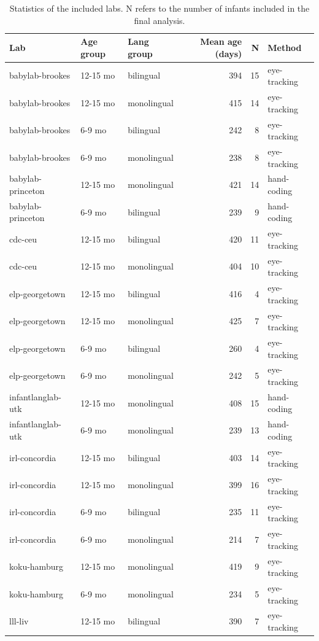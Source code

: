 \documentclass[,man,floatsintext]{apa6}
\begin{document}
\begin{longtable}[t]{lllrrl}
\caption{\label{tab:unnamed-chunk-4}Statistics of the included labs. N refers to the number of infants included in the final analysis.}\\
\toprule
Lab & Age group & Lang group & Mean age (days) & N & Method\\
\midrule
babylab-brookes & 12-15 mo & bilingual & 394 & 15 & eye-tracking\\
babylab-brookes & 12-15 mo & monolingual & 415 & 14 & eye-tracking\\
babylab-brookes & 6-9 mo & bilingual & 242 & 8 & eye-tracking\\
babylab-brookes & 6-9 mo & monolingual & 238 & 8 & eye-tracking\\
babylab-princeton & 12-15 mo & monolingual & 421 & 14 & hand-coding\\
\addlinespace
babylab-princeton & 6-9 mo & bilingual & 239 & 9 & hand-coding\\
cdc-ceu & 12-15 mo & bilingual & 420 & 11 & eye-tracking\\
cdc-ceu & 12-15 mo & monolingual & 404 & 10 & eye-tracking\\
elp-georgetown & 12-15 mo & bilingual & 416 & 4 & eye-tracking\\
elp-georgetown & 12-15 mo & monolingual & 425 & 7 & eye-tracking\\
\addlinespace
elp-georgetown & 6-9 mo & bilingual & 260 & 4 & eye-tracking\\
elp-georgetown & 6-9 mo & monolingual & 242 & 5 & eye-tracking\\
infantlanglab-utk & 12-15 mo & monolingual & 408 & 15 & hand-coding\\
infantlanglab-utk & 6-9 mo & monolingual & 239 & 13 & hand-coding\\
irl-concordia & 12-15 mo & bilingual & 403 & 14 & eye-tracking\\
\addlinespace
irl-concordia & 12-15 mo & monolingual & 399 & 16 & eye-tracking\\
irl-concordia & 6-9 mo & bilingual & 235 & 11 & eye-tracking\\
irl-concordia & 6-9 mo & monolingual & 214 & 7 & eye-tracking\\
koku-hamburg & 12-15 mo & monolingual & 419 & 9 & eye-tracking\\
koku-hamburg & 6-9 mo & monolingual & 234 & 5 & eye-tracking\\
\addlinespace
lll-liv & 12-15 mo & bilingual & 390 & 7 & eye-tracking\\

\end{longtable}
\end{document}
